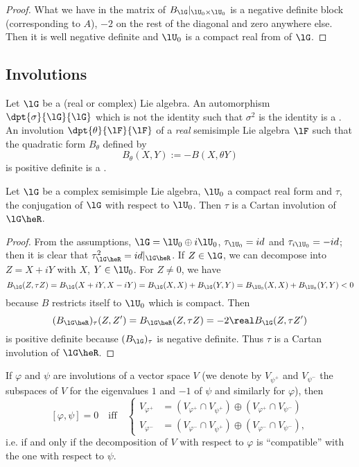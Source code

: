 \begin{proof}
	What we have in the matrix of $B_{\lG}|_{\lU_0\times\lU_0}$ is a negative definite block (corresponding to $A$), $-2$ on the rest of the diagonal and zero anywhere else. Then it is well negative definite and $\lU_0$ is a compact real from of $\lG$.
\end{proof}

\subsection{Involutions}

Let $\lG$ be a (real or complex) Lie algebra. An automorphism $\dpt{\sigma}{\lG}{\lG}$ which is not the identity such that $\sigma^2$ is the identity is a . An involution $\dpt{\theta}{\lF}{\lF}$ of a \emph{real} semisimple Lie algebra $\lF$ such that the quadratic form $B_{\theta}$ defined by
\[
	B_{\theta}(X,Y):=-B(X,\theta Y)
\]
is positive definite is a .

\begin{proposition}
	Let $\lG$ be a complex semisimple Lie algebra, $\lU_0$ a compact real form and $\tau$, the conjugation of $\lG$ with respect to $\lU_0$. Then $\tau$ is a Cartan involution of $\lG\heR$.
	\label{prop:conj_invol}
\end{proposition}

\begin{proof}
	From the assumptions, $\lG=\lU_0\oplus i\lU_0$, $\tau_{\lU_0}=id$ and $\tau_{i\lU_0}=-id$; then it is clear that $\tau_{\lG\heR}^2=id|_{\lG\heR}$. If $Z\in\lG$, we can decompose into $Z=X+iY$ with $X$, $Y\in\lU_0$. For $Z\neq 0$, we have
	\begin{equation}
		B_{\lG}(Z,\tau Z)=B_{\lG}(X+iY,X-iY)
		=B_{\lG}(X,X)+B_{\lG}(Y,Y)
		=B_{\lU_0}(X,X)+B_{\lU_0}(Y,Y)<0
	\end{equation}
	because $B$ restricts itself to $\lU_0$ which is compact. Then
	\begin{equation}
		(B_{\lG\heR})_{\tau}(Z,Z')=B_{\lG\heR}(Z,\tau Z)
		=-2\real B_{\lG}(Z,\tau Z')
	\end{equation}
	is positive definite because $(B_{\lG})_{\tau}$ is negative definite. Thus $\tau$ is a Cartan involution of $\lG\heR$.
\end{proof}

\begin{lemma}
	If $\varphi$ and $\psi$ are involutions of a vector space $V$ (we denote by $V_{\psi^+}$ and $V_{\psi^-}$ the subspaces of $V$ for the eigenvalues $1$ and $-1$ of $\psi$ and similarly for $\varphi$), then
	\[
		[\varphi,\psi]=0\quad\text{iff}\quad \left\{   \begin{aligned}
			V_{\varphi^+} & =(V_{\varphi^+}\cap V_{\psi^+})\oplus(V_{\varphi^+}\cap V_{\psi^-})  \\
			V_{\varphi^-} & =(V_{\varphi^-}\cap V_{\psi^+})\oplus(V_{\varphi^-}\cap V_{\psi^-}),
		\end{aligned}
		\right.
	\]
	i.e. if and only if the decomposition of $V$ with respect to $\varphi$ is ``compatible''{} with the one with respect to $\psi$.
	\label{lem:invol_compat}
\end{lemma}

